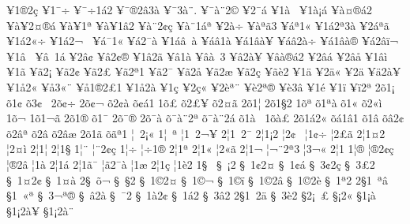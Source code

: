 {^^a51^^ae2^^e7
^^a51^^af^^f7
^^a5^^af^^f71^^e12
^^a5^^af^^ae2^^e23^^e0
^^a5^^af3^^e0^^a8.
^^a5^^af^^e0^^a82^^a9
^^a52^^af^^e1
^^a51^^e0^^a0
^^a51^^e0^^a1^^e1
^^a5^^e0^^a4^^ae^^e12
^^a5^^e0^^a52^^a4^^ae^^e1
^^a5^^e0^^a51^^aa
^^a5^^e0^^a51^^e22
^^a5^^e0^^a82^^a2^^e7
^^a5^^e0^^a81^^e1^^aa
^^a52^^e0^^f7^^ad
^^a5^^e0^^aa^^e33
^^a5^^e1^^aa1^^ab
^^a51^^e12^^aa3^^e0
^^a52^^e1^^aa^^e3
^^a51^^e12^^ab^^f7
^^a51^^e12^^ac^^a0
^^a5^^e1^^af1^^ab
^^a5^^e12^^af^^e0
^^a51^^e1^^e2^^a0^^e0
^^a5^^e1^^e21^^e0
^^a5^^e11^^e2^^e0^^a5
^^a5^^e1^^e22^^e0^^f7
^^a5^^e11^^e2^^e0^^ae
^^a5^^e12^^e2^^ef^^ac
^^a51^^e2^^a0
^^a5^^e2^^a01^^e1
^^a52^^e2^^a2
^^a5^^e22^^a2^^ae
^^a51^^e22^^ad^^e3
^^a5^^e21^^e0
^^a5^^e2^^e0^^a0^^ad3
^^a5^^e22^^e0^^a5
^^a5^^e2^^e0^^ae^^e12
^^a52^^e2^^e1
^^a52^^e2^^e5
^^a51^^e2^^ec
^^a51^^e3
^^a5^^e32^^a1
^^a5^^e32^^a2
^^a5^^e32^^a3
^^a5^^e32^^aa1
^^a5^^e32^^af
^^a5^^e32^^e5
^^a5^^e32^^e6
^^a5^^e32^^e7
^^a5^^e3^^e82
^^a51^^e4
^^a52^^e4^^ab
^^a52^^e4^^ad
^^a5^^e42^^e0^^a5
^^a51^^e52^^ab
^^a5^^e53^^ab^^a8
^^a5^^e51^^ae2^^a31
^^a51^^e52^^e0
^^a51^^e7
^^a52^^e7^^ab
^^a52^^e8^^aa^^a8
^^a5^^e82^^aa^^ae
^^a5^^e83^^e2
^^a51^^e9
^^a51^^ef
^^a5^^ef2^^aa
2^^f51^^a1
^^f51^^a2
^^f53^^a2^^a0
2^^f5^^a2^^f7
2^^f5^^a2^^ac
^^f52^^a2^^e0
^^f5^^a2^^e11
1^^f5^^a3
^^f52^^a3^^a5
^^f52^^a4^^e3
2^^f51^^a6
2^^f51^^a72
1^^f5^^aa
^^f51^^aa^^e0
^^f51^^ab
^^f52^^ab^^ec
1^^f5^^ac^^ad
1^^f51^^ac^^e3
2^^f51^^ae
^^f51^^af
2^^f5^^af^^ae
2^^f5^^af^^e0
^^f5^^af^^e0^^a82^^aa
^^f5^^af^^e0^^a82^^e1
^^f51^^e0^^a0
1^^f5^^e0^^a3
2^^f51^^e12^^ab
^^f5^^e11^^e21
^^f51^^e2
^^f5^^e22^^a2
^^f52^^e2^^aa
^^f52^^e2^^ad
^^f52^^e2^^e6
2^^f51^^e3
^^f5^^e3^^aa1
^^a6^^a02^^a1^^ab
1^^a6^^a0^^aa
^^a61^^a02^^ac^^a5
2^^a61^^a02^^af
2^^a61^^a12
^^a62^^a2^^a0
^^a61^^a2^^f7
^^a62^^a3^^e3
2^^a61^^a42
^^a62^^a4^^ec
2^^a61^^a6
2^^a61^^a7
1^^a6^^a8
^^a6^^a82^^a2^^e7
1^^a6^^f7
^^a6^^f71^^ae
2^^a61^^aa
2^^a61^^ab
^^a62^^ab^^e3
2^^a61^^ac
^^a6^^ac^^a82^^aa3
^^a63^^ac^^ab
2^^a61^^ad
1^^a6^^ae
^^a6^^ae2^^a2^^e7
^^a6^^ae2^^e2
^^a61^^e0
2^^a61^^e1
2^^a61^^e3^^af
^^a6^^e32^^af^^e0
^^a61^^e6
2^^a61^^e7
^^a61^^e82
1^^a7^^a0
^^a7^^a0^^a12
^^a7^^a01^^a22^^a4
^^a7^^a01^^a2^^e1
^^a7^^a03^^a22^^e7
^^a7^^a03^^a32
^^a7^^a01^^a42^^a2
^^a7^^a01^^a4^^e0
2^^a7^^a0^^f5^^ac
^^a7^^a0^^a72
^^a7^^a01^^a92^^a4
^^a7^^a01^^a9^^ac
^^a7^^a01^^a9^^ad^^ef
^^a7^^a01^^a92^^e2
^^a7^^a01^^a92^^e8
^^a7^^a01^^aa2
2^^a71^^a0^^aa^^e2
^^a71^^a0^^ab^^aa
^^a7^^a03^^ac^^aa^^ae
^^a7^^a0^^ad^^e22^^e0
^^a7^^a0^^af2
^^a7^^a01^^e02^^a2
^^a7^^a01^^e12
^^a7^^a03^^e22
2^^a71^^a02^^e4
^^a7^^a03^^e82
^^a72^^a1^^a0^^a3
^^a7^^a12^^ab
^^a71^^a1^^e0^^a0
^^a71^^a12^^e0^^a5
^^a71^^a12^^e0^^a8
}
